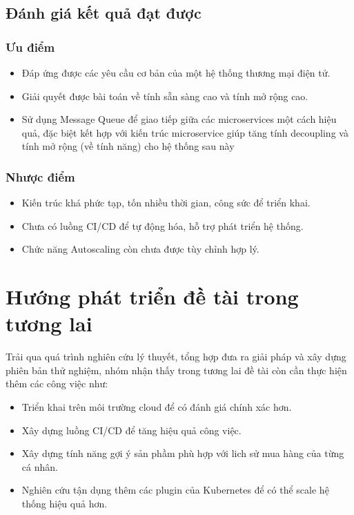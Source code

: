 \subsection{Đánh giá kết quả đạt được}
\subsubsection{Ưu điểm}
\begin{itemize}
    \item Đáp ứng được các yêu cầu cơ bản của một hệ thống thương mại điện tử.
    \item Giải quyết được bài toán về tính sẵn sàng cao và tính mở rộng cao.
    \item Sử dụng Message Queue để giao tiếp giữa các microservices một cách hiệu quả, đặc biệt kết hợp với kiến trúc microservice giúp tăng tính decoupling và tính mở rộng (về tính năng) cho hệ thống sau này
\end{itemize}
\subsubsection{Nhược điểm}
\begin{itemize}
    \item Kiến trúc khá phức tạp, tốn nhiều thời gian, công sức để triển khai.
    \item Chưa có luồng CI/CD để tự động hóa, hỗ trợ phát triển hệ thống.
    \item Chức năng Autoscaling còn chưa được tùy chỉnh hợp lý.
\end{itemize}
\section{Hướng phát triển đề tài trong tương lai}
\noindent Trải qua quá trình nghiên cứu lý thuyết, tổng hợp đưa ra giải pháp và xây dựng phiên bản thử nghiệm, nhóm nhận thấy trong tương lai đề tài còn cần thực hiện thêm các công việc như:
\begin{itemize}
    \item Triển khai trên môi trường cloud để có đánh giá chính xác hơn.
    \item Xây dựng luồng CI/CD để tăng hiệu quả công việc.
    \item Xây dựng tính năng gợi ý sản phầm phù hợp với lich sử mua hàng của từng cá nhân.
    \item Nghiên cứu tận dụng thêm các plugin của Kubernetes để có thể scale hệ thống hiệu quả hơn.
\end{itemize}